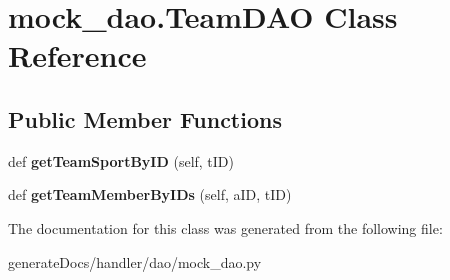 \hypertarget{classmock__dao_1_1_team_d_a_o}{}\section{mock\+\_\+dao.\+Team\+D\+AO Class Reference}
\label{classmock__dao_1_1_team_d_a_o}
\subsection*{Public Member Functions}
\begin{DoxyCompactItemize}
\item 
\mbox{\label{classmock__dao_1_1_team_d_a_o_a514028ea50a4a8df9b82ff86ffcc79e5}} 
def {\bfseries get\+Team\+Sport\+By\+ID} (self, t\+ID)
\item 
\mbox{\label{classmock__dao_1_1_team_d_a_o_ab4ca5dc04f6142a55d21c34c5571cc3e}} 
def {\bfseries get\+Team\+Member\+By\+I\+Ds} (self, a\+ID, t\+ID)
\end{DoxyCompactItemize}


The documentation for this class was generated from the following file\+:\begin{DoxyCompactItemize}
\item 
generate\+Docs/handler/dao/mock\+\_\+dao.\+py\end{DoxyCompactItemize}
